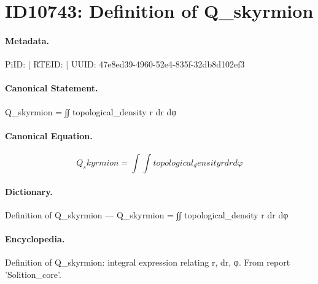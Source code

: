 \section*{ID10743: Definition of Q\_skyrmion}
\paragraph{Metadata.}
PiID:  | RTEID:  | UUID: 47e8ed39-4960-52e4-835f-32db8d102ef3

\paragraph{Canonical Statement.}
Q\_skyrmion = ∫∫ topological\_density r dr dφ

\paragraph{Canonical Equation.}
\[
Q_skyrmion = ∫∫ topological_density r dr dφ
\]

\paragraph{Dictionary.}
Definition of Q\_skyrmion — Q\_skyrmion = ∫∫ topological\_density r dr dφ

\paragraph{Encyclopedia.}
Definition of Q\_skyrmion: integral expression relating r, dr, φ. From report 'Solition\_core'.
